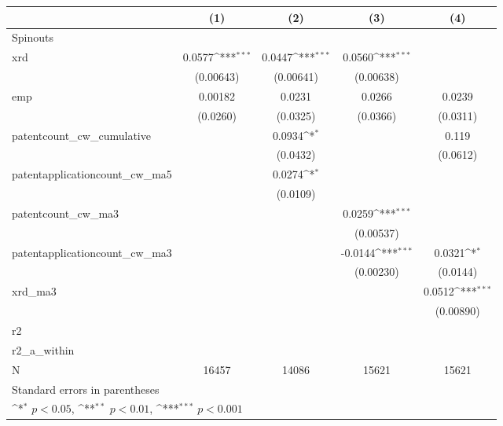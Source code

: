 {
\def\sym#1{\ifmmode^{#1}\else\(^{#1}\)\fi}
\begin{tabular}{l*{4}{c}}
\hline\hline
            &\multicolumn{1}{c}{(1)}         &\multicolumn{1}{c}{(2)}         &\multicolumn{1}{c}{(3)}         &\multicolumn{1}{c}{(4)}         \\
\hline
Spinouts    &                     &                     &                     &                     \\
xrd         &      0.0577\sym{***}&      0.0447\sym{***}&      0.0560\sym{***}&                     \\
            &   (0.00643)         &   (0.00641)         &   (0.00638)         &                     \\
[1em]
emp         &     0.00182         &      0.0231         &      0.0266         &      0.0239         \\
            &    (0.0260)         &    (0.0325)         &    (0.0366)         &    (0.0311)         \\
[1em]
patentcount\_cw\_cumulative&                     &      0.0934\sym{*}  &                     &       0.119         \\
            &                     &    (0.0432)         &                     &    (0.0612)         \\
[1em]
patentapplicationcount\_cw\_ma5&                     &      0.0274\sym{*}  &                     &                     \\
            &                     &    (0.0109)         &                     &                     \\
[1em]
patentcount\_cw\_ma3&                     &                     &      0.0259\sym{***}&                     \\
            &                     &                     &   (0.00537)         &                     \\
[1em]
patentapplicationcount\_cw\_ma3&                     &                     &     -0.0144\sym{***}&      0.0321\sym{*}  \\
            &                     &                     &   (0.00230)         &    (0.0144)         \\
[1em]
xrd\_ma3     &                     &                     &                     &      0.0512\sym{***}\\
            &                     &                     &                     &   (0.00890)         \\
\hline
r2          &                     &                     &                     &                     \\
r2\_a\_within &                     &                     &                     &                     \\
N           &       16457         &       14086         &       15621         &       15621         \\
\hline\hline
\multicolumn{5}{l}{\footnotesize Standard errors in parentheses}\\
\multicolumn{5}{l}{\footnotesize \sym{*} \(p<0.05\), \sym{**} \(p<0.01\), \sym{***} \(p<0.001\)}\\
\end{tabular}
}
